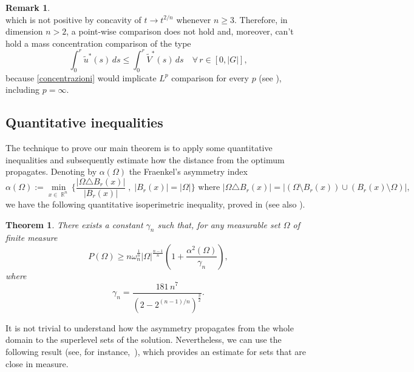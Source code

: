 \documentclass[oneside,a4paper,11pt,notitlepage]{article}
\newcommand{\abs}[1]{{\left|#1\right|}}
\theoremstyle{definition}
\theoremstyle{plain}
\newtheorem{theorem}{Theorem}[section]
\theoremstyle{definition}
\newtheorem{oss}[esempio]{Remark}
\DeclareMathOperator{\R}{\mathbb{R}}
\begin{document}
\begin{oss}
\begin{equation*}
\end{equation*}
which is not positive by concavity of $t \to t^{2/n}$ whenever $n\geq3$. Therefore, in dimension $n>2$, a point-wise comparison does not hold and, moreover, can't hold a mass concentration comparison of the type
\begin{equation}\label{concentrazioni}
    \int_0^r    \tilde u^\ast(s)\,ds\leq\int_0^r\tilde V^\ast(s)\,ds\quad\forall\, r\in[0,\abs{G}],
\end{equation}
because \eqref{concentrazioni} would implicate $L^p$ comparison for every $p$ (see \cite{ALT}), including $p=\infty$.
\end{oss}
\subsection{Quantitative inequalities}
\label{subsection2.3}
The technique to prove our main theorem is to apply some quantitative inequalities and subsequently estimate how the distance from the optimum propagates. Denoting by $\alpha(\Omega)$ the Fraenkel's asymmetry index \begin{equation*}
	\alpha(\Omega):=\min_{x \in \R^{n}}\bigg \{  \dfrac{|\Omega\triangle B_r(x)|}{|B_r(x)|} \;,\; |B_r(x)|=|\Omega|\bigg \} \text{ where } |\Omega\triangle B_r(x)|= |(\Omega\setminus B_r(x)) \cup ( B_r(x)\setminus\Omega)|,
\end{equation*}
 we have the following quantitative isoperimetric inequality, proved in \cite{FMP2} (see also \cite{CL,Fuglede,FMP,H}).


\begin{theorem}
    There exists a constant $\gamma_n$ such that,  for any measurable set $\Omega$ of finite measure
    \begin{equation}\label{quant_isop}
        P(\Omega)\geq n\omega_n^{\frac{1}{n}}\abs{\Omega}^{\frac{n-1}{n}}\left(1+\dfrac{\alpha^2(\Omega)}{\gamma_n}\right),
    \end{equation}
where
$$\gamma_n= \frac{181\, n^7}{(2-2^{(n-1)/n})^{\frac{3}{2}}}.$$
\end{theorem}

It is not trivial to understand how the asymmetry propagates from the whole domain to the superlevel sets of the solution. Nevertheless, we can use the following result (see, for instance,~\cite[Lemma~2.8]{BD}), which provides an estimate for sets that are close in measure.
\end{document}
